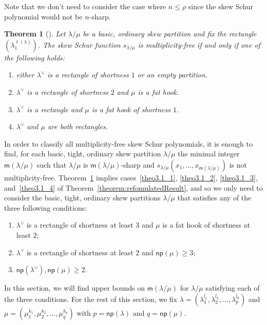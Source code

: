 \documentclass[10pt]{article}
\newtheorem{theorem}{Theorem}[section]
\theoremstyle{definition}
\newcommand{\np}{\mathsf{np}}
\newcommand{\msf}{\mathsf{m}}
\begin{document}
Note that we don't need to consider the case where $n\leq \rho$ since the skew Schur polynomial would not be $n$-sharp.



\begin{theorem}[\cite{G10, TY10}]
\label{thm:TYGUT}
 Let $\lambda/\mu$ be a basic, ordinary skew partition and fix the rectangle $(\lambda_1^{\ell(\lambda)})$. The skew Schur function $s_{\lambda/\mu}$ is multiplicity-free if and only if one of the following holds:
 \begin{enumerate}[label=(\Roman{*})]
 \item\label{theo3.2_1} either $\lambda^\vee$ is a rectangle of shortness $1$ or an empty partition.
 \item\label{theo3.2_2} $\lambda^\vee$ is a rectangle of shortness $2$ and $\mu$ is a fat hook.
 \item\label{theo3.2_3} $\lambda^\vee$ is a rectangle and $\mu$ is a fat hook of shortness $1$.
	 \item\label{theo3.2_4} $\lambda^\vee$ and $\mu$ are both rectangles.
 \end{enumerate}
\end{theorem}

In order to classify all multiplicity-free skew Schur polynomials, it is enough to find, for each basic, tight, ordinary skew partition $\lambda/\mu$ the minimal integer $\msf(\lambda/\mu)$ such that $\lambda/\mu$ is $\msf (\lambda/\mu)$-sharp and $s_{\lambda/\mu}(x_1,\ldots,x_{\msf (\lambda/\mu)})$ is not multiplicity-free. Theorem~\ref{thm:TYGUT} implies cases~\ref{theo3.1_1}, \ref{theo3.1_2}, \ref{theo3.1_3}, and~\ref{theo3.1_4} of Theorem~\ref{theorem:refomulatedResult}, and so we only need to consider the basic, tight, ordinary skew partitions $\lambda/\mu$ that satisfies any of the three following conditions:
\begin{enumerate}[label=(\Roman{*})]
 \item\label{theo3.2_cond1} $\lambda^\vee$ is a rectangle of shortness at least $3$ and $\mu$ is a fat hook of shortness at least $2$;
 \item\label{theo3.2_cond2} $\lambda^\vee$ is a rectangle of shortness at least $2$ and $\np (\mu) \geq 3$;
 \item\label{theo3.2_cond3} $\np (\lambda^\vee), \np (\mu) \geq 2$.
\end{enumerate}
 In this section, we will find upper bounds on $\msf (\lambda/\mu)$ for $\lambda/\mu$ satisfying each of the three conditions. For the rest of this section, we fix $\lambda = (\lambda_1^{l_1},\lambda_2^{l_2},\ldots,\lambda_p^{l_p})$ and $\mu = (\mu_1^{k_1},\mu_2^{k_2},\ldots,\mu_q^{k_q})$ with $p = \np (\lambda)$ and $q = \np (\mu)$.
\end{document}
